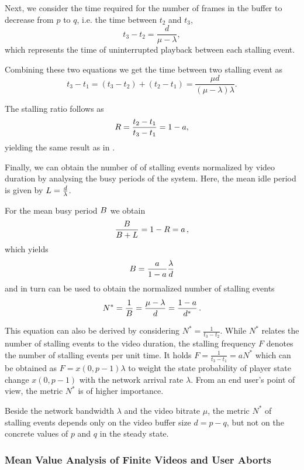 Next, we consider the time required for the number of frames \currentNumberFrames in the buffer to decrease from \(p\) 
to \(q\), i.e. the time between \(t_2\) and \(t_3\), 
\[t_3-t_2 = \frac{d}{\mu-\lambda},\]
which represents the time of uninterrupted playback between each stalling event.

Combining these two equations we get the time between two stalling event as
\[
t_3-t_1=(t_3-t_2)+(t_2-t_1)=\frac{\mu d}{(\mu-\lambda)\lambda}.
\]

The stalling ratio \stallingRatio follows as
\begin{equation*}
R = \frac{t_2-t_1}{t_3-t_1} = 1-a,
\end{equation*}
yielding the same result as in .

Finally, we can obtain the number of of stalling events normalized by video duration by analysing the busy periods of the system.
Here, the mean idle period is given by \(L = \frac{d}{\lambda}\).

For the mean busy period \(B\) we obtain
\[
\frac{B}{B + L} = 1 - R = a \, ,
\]
which yields
\[
B = \frac{a}{1-a}\frac{\lambda}{d} 
\]
and in turn can be used to obtain the normalized number of stalling events 
\begin{equation*}
N^* = \frac{1}{B}=\frac{\mu-\lambda}{d} = \frac{1-a}{d^*}\, .
\end{equation*}

This equation can also be derived by considering \(N^*=\frac{1}{t_3-t_2}\). 
While \(N^*\) relates the number of stalling events to the video duration, the stalling frequency \(F\) denotes the number of stalling events per unit time. 
It holds \(F=\frac{1}{t_3-t_1}=a N^*\) which can be obtained as \(F=x(0,p-1) \lambda\) to weight the state probability of player state change \(x(0,p-1)\) with the network arrival rate \(\lambda\). 
From an end user's point of view, the metric $N^*$ is of higher importance. 

Beside the network bandwidth \(\lambda\) and the video bitrate \(\mu\), the metric \(N^*\) of stalling events depends only on the video buffer size \(d=p-q\), but not on the concrete values of \(p\) and \(q\) in the steady state.


\subsubsection*{Mean Value Analysis of Finite Videos and User Aborts}\label{sec:application:qoe_user_behaviour:system_model:finite_video}

